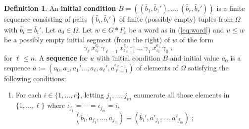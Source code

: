 \documentclass{article}
\theoremstyle{remark}
\theoremstyle{definition}
\newtheorem{definition}[theorem]{Definition}
\begin{document}
{\begin{definition}\label{def:sequence} An  \textbf{initial condition} $B=((\bar{b}_1, \bar{b}_1'),\ldots,(\bar{b}_r, \bar{b}_r'))$ is a finite sequence consisting of pairs $(\bar{b}_i, \bar{b}_i')$  of finite {(possibly empty)}  tuples from $\Omega$ with $\bar{b}_i\equiv \bar{b}_i'$. 
 Let $a_0\in\Omega$. Let $w\in G* F_r$ be a 
 word as in (\ref{eq:word}) and $u\leq w$ be a {possibly empty} initial segment (from the right)  of $w$ of the form 
\begin{equation}\label{eq:subword}
   \gamma_\ell\ x_{\iota_\ell}^{\epsilon_\ell}\ \gamma_{\ell-1}\  x_{\iota_{\ell-1}}^{\epsilon_{\ell-1}}\ \dots\ \gamma_1\ x_{\iota_{1}}^{\epsilon_1}\ \gamma_0\;, 
\end{equation}
for $\ell\leq n$. %
A \textbf{sequence} for $u$ with initial condition $B$ and initial value $a_0$ 
is a sequence $\overline{a}:=(a_0, a_1, a_1'\dots, a_\ell, a_\ell', a^{\epsilon_{\ell+1}}_{\ell+1})$ of elements of $\Omega$  
satisfying the following conditions:
    \begin{enumerate}
    \item For each $i\in\{1, \dots, r\}$,  
    letting $j_1,\ldots,j_m$ enumerate all  those elements in %
    {$\{1, \dots, \ell\}$} where $\iota_{j_1}=\cdots=\iota_{j_m}=i$, 
    \[(\bar{b}_i,a_{j_1},\dots, a_{j_m})\equiv (\bar{b}_i',a'_{j_1},\dots, a'_{j_m})\;;\]


\end{enumerate}
\end{definition}}
\end{document}
